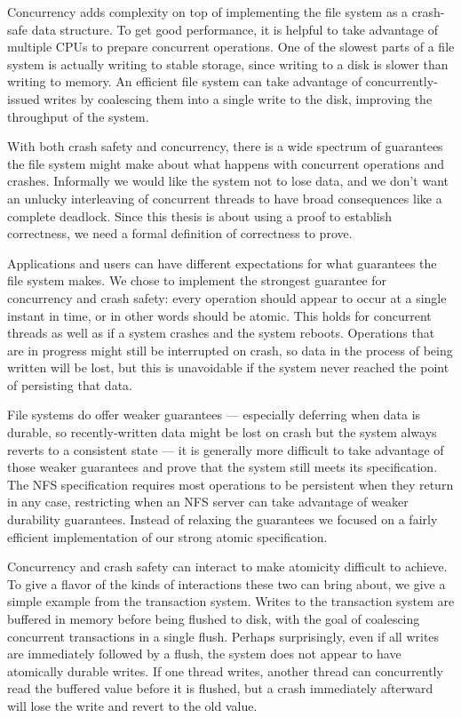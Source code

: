 Concurrency adds complexity on top of implementing the file system as a
crash-safe data structure. To get good performance, it is helpful to take
advantage of multiple CPUs to prepare concurrent operations. One of the slowest
parts of a file system is actually writing to stable storage, since writing to a
disk is slower than writing to memory. An efficient file system can take
advantage of concurrently-issued writes by coalescing them into a single write
to the disk, improving the throughput of the system.

With both crash safety and concurrency, there is a wide spectrum of guarantees
the file system might make about what happens with concurrent operations and
crashes. Informally we would like the system not to lose data, and we don't want
an unlucky interleaving of concurrent threads to have broad consequences like a
complete deadlock. Since this thesis is about using a proof to establish
correctness, we need a formal definition of correctness to prove.

Applications and users can have different expectations for what guarantees the
file system makes. We chose to implement the strongest guarantee for concurrency
and crash safety: every operation should appear to occur at a single instant in
time, or in other words should be atomic. This holds for concurrent threads as
well as if a system crashes and the system reboots. Operations that are in
progress might still be interrupted on crash, so data in the process of being
written will be lost, but this is unavoidable if the system never reached the
point of persisting that data.

File systems do offer weaker guarantees --- especially deferring when data is
durable, so recently-written data might be lost on crash but the system always
reverts to a consistent state --- it is generally more difficult to take
advantage of those weaker guarantees and prove that the system still meets its
specification. The NFS specification requires most operations to be persistent
when they return in any case, restricting when an NFS server can take advantage
of weaker durability guarantees. Instead of relaxing the guarantees we focused
on a fairly efficient implementation of our strong atomic specification.

Concurrency and crash safety can interact to make atomicity difficult to
achieve. To give a flavor of the kinds of interactions these two can bring
about, we give a simple example from the transaction system. Writes to the
transaction system are buffered in memory before being flushed to disk, with the
goal of coalescing concurrent transactions in a single flush. Perhaps
surprisingly, even if all writes are immediately followed by a flush, the system
does not appear to have atomically durable writes. If one thread writes, another
thread can concurrently read the buffered value before it is flushed, but a
crash immediately afterward will lose the write and revert to the old value.

